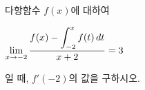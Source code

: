 다항함수 $f(x)$에 대하여 \par\smallskip\noindent\hspace*{1.5em}$\displaystyle\lim_{x\to -2} \dfrac{f(x)-\displaystyle\int_{-2}^{x} f(t)\mkern3mu dt}{x+2}=3$\par\smallskip\noindent 일 때, $f'(-2)$의 값을 구하시오.
